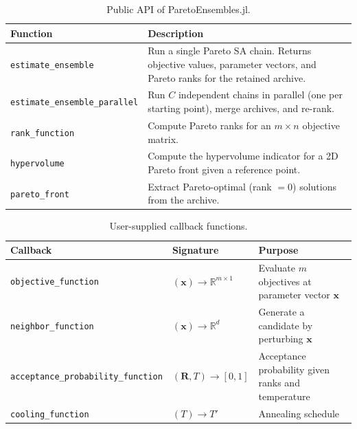 \documentclass[12pt]{article}
\begin{document}
\begin{table}[ht]
\centering
\caption{Public API of ParetoEnsembles.jl.}\label{tab:api}
\begin{tabular}{@{}lp{7.5cm}@{}}
\toprule
\textbf{Function} & \textbf{Description} \\
\midrule
\texttt{estimate\_ensemble} & Run a single Pareto SA chain. Returns objective values, parameter vectors, and Pareto ranks for the retained archive. \\
\texttt{estimate\_ensemble\_parallel} & Run $C$ independent chains in parallel (one per starting point), merge archives, and re-rank. \\
\texttt{rank\_function} & Compute Pareto ranks for an $m \times n$ objective matrix. \\
\texttt{hypervolume} & Compute the hypervolume indicator for a 2D Pareto front given a reference point. \\
\texttt{pareto\_front} & Extract Pareto-optimal (rank $= 0$) solutions from the archive. \\
\bottomrule
\end{tabular}
\end{table}

\begin{table}[ht]
\centering
\caption{User-supplied callback functions.}\label{tab:callbacks}
\small
\begin{tabular}{@{}lp{2.8cm}p{4.5cm}@{}}
\toprule
\textbf{Callback} & \textbf{Signature} & \textbf{Purpose} \\
\midrule
\texttt{objective\_function} & $(\mathbf{x}) \to \mathbb{R}^{m \times 1}$ & Evaluate $m$ objectives at parameter vector $\mathbf{x}$ \\
\texttt{neighbor\_function} & $(\mathbf{x}) \to \mathbb{R}^{d}$ & Generate a candidate by perturbing $\mathbf{x}$ \\
\texttt{acceptance\_probability\_function} & $(\mathbf{R}, T) \to [0,1]$ & Acceptance probability given ranks and temperature \\
\texttt{cooling\_function} & $(T) \to T'$ & Annealing schedule \\
\bottomrule
\end{tabular}
\end{table}

\end{document}
